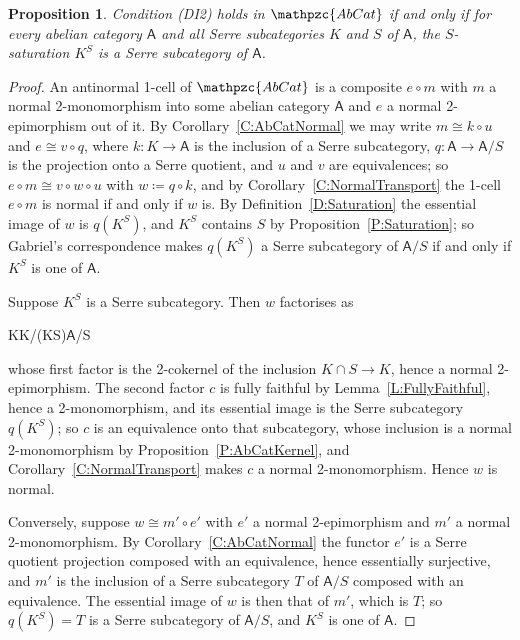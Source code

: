 \documentclass[reqno,a4paper]{amsart}
\numberwithin{equation}{section}
\theoremstyle{plain}
\newtheorem{proposition}[subsection]{Proposition}
\theoremstyle{definition}
\def\nameit#1{\textrm{#1}~}
\def\prox{\nameit{Proposition}}
\def\corx{\nameit{Corollary}}
\def\lemx{\nameit{Lemma}}
\def\defx{\nameit{Definition}}
\newenvironment{eqD*}{\begin{equation*}}{\end{equation*}\ignorespacesafterend}
\newcommand{\comp}{\circ}
\newcommand{\iso}{\cong}
\newcommand{\catfont}[1]{\ensuremath{\mathpzc{#1}}\xspace}
\newcommand{\onecat}[1]{\ensuremath{\mathsf{#1}}\xspace}
\newcommand{\AbCat}{\catfont{AbCat}}
\renewcommand{\1}{\onecat{1}}
\newcommand{\toe}{\twoheadrightarrow}
\newcommand{\aar}[2][]{\xrightarrow[#1]{#2}}
\begin{document}
\begin{proposition}\label{P:DIabcat}
	Condition \textup{(DI2)} holds in \(\AbCat\) if and only if for every abelian category \(\onecat{A}\) and all Serre subcategories \(K\) and \(S\) of \(\onecat{A}\), the \(S\)-saturation \(K^{S}\) is a Serre subcategory of \(\onecat{A}\).
\end{proposition}

\begin{proof}
	An antinormal 1-cell of \(\AbCat\) is a composite \(e\comp m\) with \(m\) a normal 2-monomorphism into some abelian category \(\onecat{A}\) and \(e\) a normal 2-epimorphism out of it. By \corx\ref{C:AbCatNormal} we may write \(m\iso k\comp u\) and \(e\iso v\comp q\), where \(k\colon K\to\onecat{A}\) is the inclusion of a Serre subcategory, \(q\colon\onecat{A}\to\onecat{A}/S\) is the projection onto a Serre quotient, and \(u\) and \(v\) are equivalences; so \(e\comp m\iso v\comp w\comp u\) with \(w\coloneq q\comp k\), and by \corx\ref{C:NormalTransport} the 1-cell \(e\comp m\) is normal if and only if \(w\) is. By \defx\ref{D:Saturation} the essential image of \(w\) is \(q(K^{S})\), and \(K^{S}\) contains \(S\) by \prox\ref{P:Saturation}; so Gabriel's correspondence makes \(q(K^{S})\) a Serre subcategory of \(\onecat{A}/S\) if and only if \(K^{S}\) is one of \(\onecat{A}\).

	Suppose \(K^{S}\) is a Serre subcategory. Then \(w\) factorises as
	\begin{eqD*}
		K\toe K/(K\cap S)\aar{c}\onecat{A}/S\text{,}
	\end{eqD*}
	whose first factor is the 2-cokernel of the inclusion \(K\cap S\to K\), hence a normal 2-epimorphism. The second factor \(c\) is fully faithful by \lemx\ref{L:FullyFaithful}, hence a 2-monomorphism, and its essential image is the Serre subcategory \(q(K^{S})\); so \(c\) is an equivalence onto that subcategory, whose inclusion is a normal 2-monomorphism by \prox\ref{P:AbCatKernel}, and \corx\ref{C:NormalTransport} makes \(c\) a normal 2-monomorphism. Hence \(w\) is normal.

	Conversely, suppose \(w\iso m'\comp e'\) with \(e'\) a normal 2-epimorphism and \(m'\) a normal 2-monomorphism. By \corx\ref{C:AbCatNormal} the functor \(e'\) is a Serre quotient projection composed with an equivalence, hence essentially surjective, and \(m'\) is the inclusion of a Serre subcategory \(T\) of \(\onecat{A}/S\) composed with an equivalence. The essential image of \(w\) is then that of \(m'\), which is \(T\); so \(q(K^{S})=T\) is a Serre subcategory of \(\onecat{A}/S\), and \(K^{S}\) is one of \(\onecat{A}\).
\end{proof}
\end{document}
